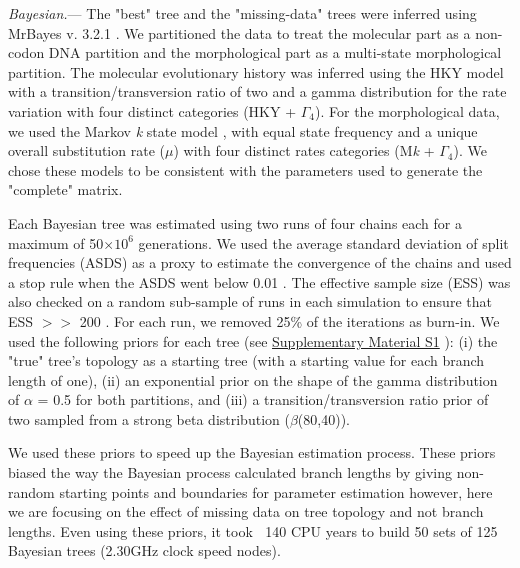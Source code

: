 \documentclass[12pt,letterpaper]{article}
\renewcommand{\subsubsection}[1]{%
\vspace{2ex}
\noindent
\textit{#1.}---}
\begin{document}
\subsubsection{Bayesian}
The "best" tree and the "missing-data" trees were inferred using MrBayes v. 3.2.1 \citep{Ronquist2012mrbayes}. We partitioned the data to treat the molecular part as a non-codon DNA partition and the morphological part as a multi-state morphological partition. The molecular evolutionary history was inferred using the HKY model with a transition/transversion ratio of two \citep{douadycomparison2003} and a gamma distribution for the rate variation with four distinct categories (HKY + $\Gamma_4$). For the morphological data, we used the Markov \textit{k} state model \citep{lewisa2001}, with equal state frequency and a unique overall substitution rate ($\mu$) with four distinct rates categories (M\textit{k} + $\Gamma_4$). We chose these models to be consistent with the parameters used to generate the "complete" matrix.

Each Bayesian tree was estimated using two runs of four chains each for a maximum of 50$\times$$10^6$ generations.
 We used the average standard deviation of split frequencies (ASDS) as a proxy to estimate the convergence of the chains and used a stop rule when the ASDS went below 0.01 \citep{Ronquist2012mrbayes}. The effective sample size (ESS) was also checked on a random sub-sample of runs in each simulation to ensure that ESS $>>$ 200 \citep{drummond2006ess}. For each run, we removed 25\% of the iterations as burn-in. We used the following priors for each tree (see \hyperref[SupplementaryMaterial]{Supplementary Material S1}
 ): (i) the "true" tree’s topology as a starting tree (with a starting value for each branch length of one), (ii) an exponential prior on the shape of the gamma distribution of $\alpha$ = 0.5 for both partitions, and (iii) a transition/transversion ratio prior of two sampled from a strong beta distribution ($\beta$(80,40)).

We used these priors to speed up the Bayesian estimation process. These priors biased the way the Bayesian process calculated branch lengths by giving non-random starting points and boundaries for parameter estimation however, here we are focusing on the effect of missing data on tree topology and not branch lengths. Even using these priors, it took $~$ %
140 CPU years to build 50 sets of 125 Bayesian trees (2.30GHz clock speed nodes).
\end{document}
